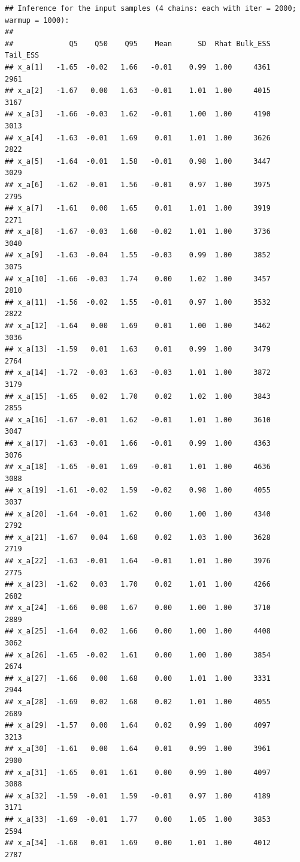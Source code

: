 \documentclass[american,]{article}
\begin{document}
\begin{verbatim}
## Inference for the input samples (4 chains: each with iter = 2000; warmup = 1000):
## 
##             Q5    Q50    Q95    Mean      SD  Rhat Bulk_ESS Tail_ESS
## x_a[1]   -1.65  -0.02   1.66   -0.01    0.99  1.00     4361     2961
## x_a[2]   -1.67   0.00   1.63   -0.01    1.01  1.00     4015     3167
## x_a[3]   -1.66  -0.03   1.62   -0.01    1.00  1.00     4190     3013
## x_a[4]   -1.63  -0.01   1.69    0.01    1.01  1.00     3626     2822
## x_a[5]   -1.64  -0.01   1.58   -0.01    0.98  1.00     3447     3029
## x_a[6]   -1.62  -0.01   1.56   -0.01    0.97  1.00     3975     2795
## x_a[7]   -1.61   0.00   1.65    0.01    1.01  1.00     3919     2271
## x_a[8]   -1.67  -0.03   1.60   -0.02    1.01  1.00     3736     3040
## x_a[9]   -1.63  -0.04   1.55   -0.03    0.99  1.00     3852     3075
## x_a[10]  -1.66  -0.03   1.74    0.00    1.02  1.00     3457     2810
## x_a[11]  -1.56  -0.02   1.55   -0.01    0.97  1.00     3532     2822
## x_a[12]  -1.64   0.00   1.69    0.01    1.00  1.00     3462     3036
## x_a[13]  -1.59   0.01   1.63    0.01    0.99  1.00     3479     2764
## x_a[14]  -1.72  -0.03   1.63   -0.03    1.01  1.00     3872     3179
## x_a[15]  -1.65   0.02   1.70    0.02    1.02  1.00     3843     2855
## x_a[16]  -1.67  -0.01   1.62   -0.01    1.01  1.00     3610     3047
## x_a[17]  -1.63  -0.01   1.66   -0.01    0.99  1.00     4363     3076
## x_a[18]  -1.65  -0.01   1.69   -0.01    1.01  1.00     4636     3088
## x_a[19]  -1.61  -0.02   1.59   -0.02    0.98  1.00     4055     3037
## x_a[20]  -1.64  -0.01   1.62    0.00    1.00  1.00     4340     2792
## x_a[21]  -1.67   0.04   1.68    0.02    1.03  1.00     3628     2719
## x_a[22]  -1.63  -0.01   1.64   -0.01    1.01  1.00     3976     2775
## x_a[23]  -1.62   0.03   1.70    0.02    1.01  1.00     4266     2682
## x_a[24]  -1.66   0.00   1.67    0.00    1.00  1.00     3710     2889
## x_a[25]  -1.64   0.02   1.66    0.00    1.00  1.00     4408     3062
## x_a[26]  -1.65  -0.02   1.61    0.00    1.00  1.00     3854     2674
## x_a[27]  -1.66   0.00   1.68    0.00    1.01  1.00     3331     2944
## x_a[28]  -1.69   0.02   1.68    0.02    1.01  1.00     4055     2689
## x_a[29]  -1.57   0.00   1.64    0.02    0.99  1.00     4097     3213
## x_a[30]  -1.61   0.00   1.64    0.01    0.99  1.00     3961     2900
## x_a[31]  -1.65   0.01   1.61    0.00    0.99  1.00     4097     3088
## x_a[32]  -1.59  -0.01   1.59   -0.01    0.97  1.00     4189     3171
## x_a[33]  -1.69  -0.01   1.77    0.00    1.05  1.00     3853     2594
## x_a[34]  -1.68   0.01   1.69    0.00    1.01  1.00     4012     2787

\end{verbatim}
\end{document}
